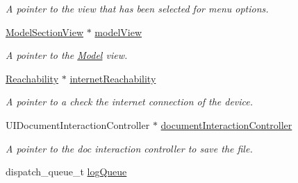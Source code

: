 \begin{DoxyCompactItemize}
\begin{DoxyCompactList}\small\item\em A pointer to the view that has been selected for menu options. \end{DoxyCompactList}\item 
\hypertarget{interface_model_section_view_controller_a9c639830cd11257200b4bdb107ce30d7}{\hyperlink{interface_model_section_view}{Model\-Section\-View} $\ast$ \hyperlink{interface_model_section_view_controller_a9c639830cd11257200b4bdb107ce30d7}{model\-View}}\label{interface_model_section_view_controller_a9c639830cd11257200b4bdb107ce30d7}

\begin{DoxyCompactList}\small\item\em A pointer to the \hyperlink{interface_model}{Model} view. \end{DoxyCompactList}\item 
\hypertarget{interface_model_section_view_controller_add10e7d857093908d7e78eda4888c848}{\hyperlink{interface_reachability}{Reachability} $\ast$ \hyperlink{interface_model_section_view_controller_add10e7d857093908d7e78eda4888c848}{internet\-Reachability}}\label{interface_model_section_view_controller_add10e7d857093908d7e78eda4888c848}

\begin{DoxyCompactList}\small\item\em A pointer to a check the internet connection of the device. \end{DoxyCompactList}\item 
\hypertarget{interface_model_section_view_controller_a40778056811a8d1ad7c407333b490120}{U\-I\-Document\-Interaction\-Controller $\ast$ \hyperlink{interface_model_section_view_controller_a40778056811a8d1ad7c407333b490120}{document\-Interaction\-Controller}}\label{interface_model_section_view_controller_a40778056811a8d1ad7c407333b490120}

\begin{DoxyCompactList}\small\item\em A pointer to the doc interaction controller to save the file. \end{DoxyCompactList}\item 
\hypertarget{interface_model_section_view_controller_a108fcdbf1198ced2d10fe789ba64f585}{dispatch\-\_\-queue\-\_\-t \hyperlink{interface_model_section_view_controller_a108fcdbf1198ced2d10fe789ba64f585}{log\-Queue}}\label{interface_model_section_view_controller_a108fcdbf1198ced2d10fe789ba64f585}


\end{DoxyCompactItemize}
